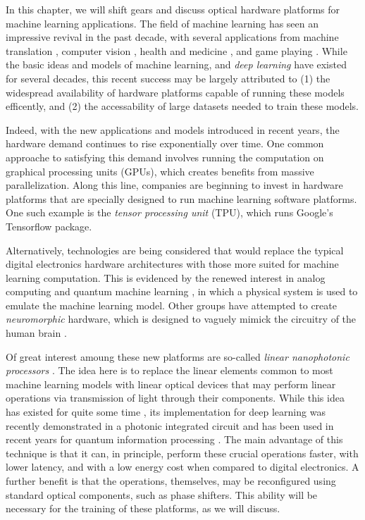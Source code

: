 
In this chapter, we will shift gears and discuss optical hardware platforms for machine learning applications.
The field of machine learning has seen an impressive revival in the past decade, with several applications from machine translation \cite{brown1993mathematics}, computer vision \cite{faugeras1993three}, health and medicine \cite{esteva2017dermatologist}, and game playing \cite{silver2017mastering}.
While the basic ideas and models of machine learning, and \textit{deep learning} \cite{goodfellow2016deep,lecun2015deep} have existed for several decades, this recent success may be largely attributed to (1) the widespread availability of hardware platforms capable of running these models efficently, and (2) the accessability of large datasets needed to train these models.

Indeed, with the new applications and models introduced in recent years, the hardware demand continues to rise exponentially over time.
One common approache to satisfying this demand involves running the computation on graphical processing units (GPUs), which creates benefits from massive parallelization.
Along this line, companies are beginning to invest in hardware platforms that are specially designed to run machine learning software platforms.
One such example is the \textit{tensor processing unit} (TPU), which runs Google's Tensorflow package.

Alternatively, technologies are being considered that would replace the typical digital electronics hardware architectures with those more suited for machine learning computation.
This is evidenced by the renewed interest in analog computing and quantum machine learning  \cite{biamonte_quantum_2017}, in which a physical system is used to emulate the machine learning model.
Other groups have attempted to create \textit{neuromorphic} hardware, which is designed to vaguely mimick the circuitry of the human brain \cite{tait_neuromorphic_2017}.

Of great interest amoung these new platforms are so-called \textit{linear nanophotonic processors} \cite{harris2018linear}.
The idea here is to replace the linear elements common to most machine learning models with linear optical devices that may perform linear operations via transmission of light through their components.
While this idea has existed for quite some time \cite{miller_sorting_2015,Miller2015,Miller2013a,miller_perfect_2015,miller_self-aligning_2013}, its implementation for deep learning was recently demonstrated in a photonic integrated circuit \cite{shen2017deep} and has been used in recent years for quantum information processing \cite{obrien_photonic_2009}.
The main advantage of this technique is that it can, in principle, perform these crucial operations faster, with lower latency, and with a low energy cost when compared to digital electronics.
A further benefit is that the operations, themselves, may be reconfigured using standard optical components, such as phase shifters.
This ability will be necessary for the training of these platforms, as we will discuss.

